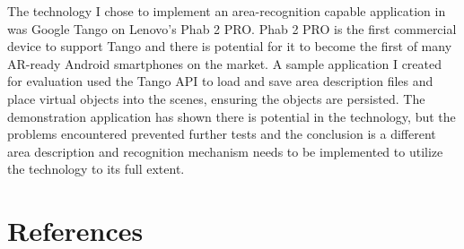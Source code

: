 \documentclass[12pt, a4paper]{article}
\begin{document}
The technology I chose to implement an area-recognition capable application in was Google Tango on Lenovo’s Phab 2 PRO. Phab 2 PRO is the first commercial device to support Tango and there is potential for it to become the first of many AR-ready Android smartphones on the market. A sample application I created for evaluation used the Tango API to load and save area description files and place virtual objects into the scenes, ensuring the objects are persisted. The demonstration application has shown there is potential in the technology, but the problems encountered prevented further tests and the conclusion is a different area description and recognition mechanism needs to be implemented to utilize the technology to its full extent.

\section{References}
\end{document}
